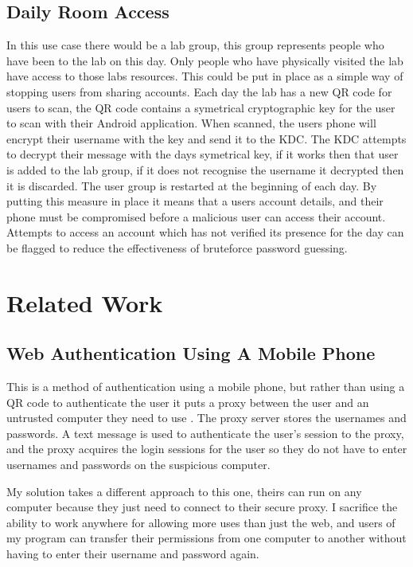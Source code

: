 \documentclass[]{report}   %
\begin{document}
\subsection{Daily Room Access}
In this use case there would be a lab group, this group represents people who have been to the lab on this day. Only people who have physically visited the lab have access to those labs resources. This could be put in place as a simple way of stopping users from sharing accounts. Each day the lab has a new QR code for users to scan, the QR code contains a symetrical cryptographic key for the user to scan with their Android application. When scanned, the users phone will encrypt their username with the key and send it to the KDC. The KDC attempts to decrypt their message with the days symetrical key, if it works then that user is added to the lab group, if it does not recognise the username it decrypted then it is discarded. The user group is restarted at the beginning of each day. By putting this measure in place it means that a users account details, and their phone must be compromised before a malicious user can access their account. Attempts to access an account which has not verified its presence for the day can be flagged to reduce the effectiveness of bruteforce password guessing.


\section{Related Work}
\subsection {Web Authentication Using A Mobile Phone}
This is a method of authentication using a mobile phone, but rather than using a QR code to authenticate the user it puts a proxy between the user and an untrusted computer they need to use \cite{MobileRelated}. The proxy server stores the usernames and passwords. A text message is used to authenticate the user's session to the proxy, and the proxy acquires the login sessions for the user so they do not have to enter usernames and passwords on the suspicious computer.

My solution takes a different approach to this one, theirs can run on any computer because they just need to connect to their secure proxy. I sacrifice the ability to work anywhere for allowing more uses than just the web, and users of my program can transfer their permissions from one computer to another without having to enter their username and password again. 
\end{document}
